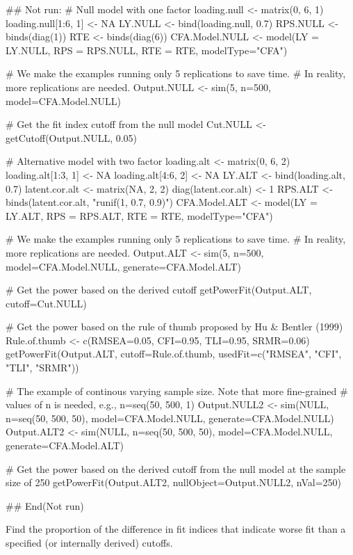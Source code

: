 \documentclass[a4paper]{book}
\begin{document}
%
\begin{Examples}
\begin{ExampleCode}
## Not run: 
# Null model with one factor
loading.null <- matrix(0, 6, 1)
loading.null[1:6, 1] <- NA
LY.NULL <- bind(loading.null, 0.7)
RPS.NULL <- binds(diag(1))
RTE <- binds(diag(6))
CFA.Model.NULL <- model(LY = LY.NULL, RPS = RPS.NULL, RTE = RTE, modelType="CFA")

# We make the examples running only 5 replications to save time.
# In reality, more replications are needed.
Output.NULL <- sim(5, n=500, model=CFA.Model.NULL)

# Get the fit index cutoff from the null model
Cut.NULL <- getCutoff(Output.NULL, 0.05)

# Alternative model with two factor
loading.alt <- matrix(0, 6, 2)
loading.alt[1:3, 1] <- NA
loading.alt[4:6, 2] <- NA
LY.ALT <- bind(loading.alt, 0.7)
latent.cor.alt <- matrix(NA, 2, 2)
diag(latent.cor.alt) <- 1
RPS.ALT <- binds(latent.cor.alt, "runif(1, 0.7, 0.9)")
CFA.Model.ALT <- model(LY = LY.ALT, RPS = RPS.ALT, RTE = RTE, modelType="CFA")

# We make the examples running only 5 replications to save time.
# In reality, more replications are needed.
Output.ALT <- sim(5, n=500, model=CFA.Model.NULL, generate=CFA.Model.ALT)

# Get the power based on the derived cutoff
getPowerFit(Output.ALT, cutoff=Cut.NULL)

# Get the power based on the rule of thumb proposed by Hu & Bentler (1999)
Rule.of.thumb <- c(RMSEA=0.05, CFI=0.95, TLI=0.95, SRMR=0.06)
getPowerFit(Output.ALT, cutoff=Rule.of.thumb, usedFit=c("RMSEA", "CFI", "TLI", "SRMR"))

# The example of continous varying sample size. Note that more fine-grained 
# values of n is needed, e.g., n=seq(50, 500, 1)
Output.NULL2 <- sim(NULL, n=seq(50, 500, 50), model=CFA.Model.NULL, generate=CFA.Model.NULL)
Output.ALT2 <- sim(NULL, n=seq(50, 500, 50), model=CFA.Model.NULL, generate=CFA.Model.ALT)

# Get the power based on the derived cutoff from the null model at the sample size of 250
getPowerFit(Output.ALT2, nullObject=Output.NULL2, nVal=250)

## End(Not run)
\end{ExampleCode}
\end{Examples}
%
\begin{Description}\relax
Find the proportion of the difference in fit indices that indicate worse fit than a specified (or internally derived) cutoffs. 
\end{Description}
\end{document}
